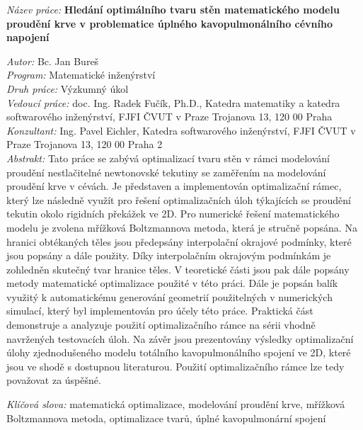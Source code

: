 \begin{onehalfspace}
\noindent \emph{Název práce:}
\noindent \textbf{Hledání optimálního tvaru stěn matematického modelu proudění krve v problematice úplného kavopulmonálního cévního napojení}
\end{onehalfspace}
\noindent \emph{Autor:} Bc. Jan Bureš\\[2pt]
\noindent \emph{Program:} Matematické inženýrství\\[2pt]
\noindent \emph{Druh práce:} Výzkumný úkol\\[2pt]
\noindent \emph{Vedoucí práce:} doc. Ing. Radek Fučík, Ph.D.,
Katedra matematiky a katedra softwarového inženýrství, FJFI ČVUT v Praze
Trojanova 13, 120 00 Praha\\[2pt]
\noindent \emph{Konzultant:} Ing. Pavel Eichler, Katedra softwarového inženýrství, FJFI ČVUT v Praze
Trojanova 13, 120 00 Praha 2\\[2pt]
\noindent \emph{Abstrakt:} Tato práce se zabývá optimalizací tvaru stěn v rámci modelování proudění nestlačitelné newtonovské tekutiny se zaměřením na modelování proudění krve v cévách. Je představen a implementován optimalizační rámec, který lze následně využít pro řešení optimalizačních úloh týkajících se proudění tekutin okolo rigidních překážek ve 2D. Pro numerické řešení matematického modelu je zvolena mřížková Boltzmannova metoda, která je stručně popsána.
Na hranici obtékaných těles jsou předepsány interpolační okrajové podmínky, které jsou popsány a dále použity. Díky interpolačním okrajovým podmínkám je zohledněn skutečný tvar hranice těles.
V teoretické části jsou pak dále popsány metody matematické optimalizace použité v této práci. Dále je popsán balík využitý k automatickému generování geometrií použitelných v numerických simulací, který byl implementován pro účely této práce. Praktická část demonstruje a analyzuje použití optimalizačního rámce na sérii vhodně navržených testovacích úloh. Na závěr jsou prezentovány výsledky optimalizační úlohy zjednodušeného modelu totálního kavopulmonálního spojení ve 2D, které jsou ve shodě s dostupnou literaturou. Použití optimalizačního rámce lze tedy považovat za úspěšné.

\bigskip{}

\noindent \emph{Klíčová slova:} matematická optimalizace, modelování proudění krve, mřížková Boltzmannova metoda, optimalizace tvarů, úplné kavopulmonární spojení
\vfill{}
~


